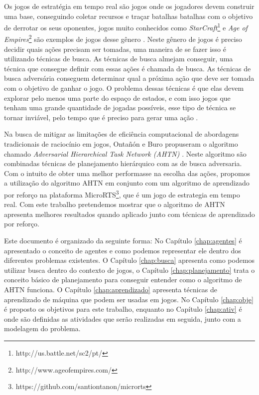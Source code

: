 Os jogos de estratégia em tempo real são jogos onde os jogadores devem construir uma base, conseguindo coletar recursos e traçar batalhas batalhas com o objetivo de derrotar os seus oponentes, jogos muito conhecidos como \textit{StarCraft}\footnote{http://us.battle.net/sc2/pt/} e \textit{Age of Empires}\footnote{http://www.ageofempires.com/} são exemplos de jogos desse gênero \cite{ontanon2013survey}.
Neste gênero de jogos é preciso decidir quais ações precisam ser tomadas, uma maneira de se fazer isso é utilizando técnicas de busca. As técnicas de busca almejam conseguir, uma técnica que consegue definir com essas ações é chamada de busca.
As técnicas de busca adversária conseguem determinar qual a próxima ação que deve ser tomada com o objetivo de ganhar o jogo. O problema dessas técnicas é que elas devem explorar pelo menos uma parte do espaço de estados, e com isso jogos que tenham uma grande quantidade de jogadas possíveis, esse tipo de técnica se tornar inviável, pelo tempo que é preciso para gerar uma ação \cite{ontanon2012experiments}.  

Na busca de mitigar as limitações de eficiência computacional de abordagens tradicionais de raciocínio em jogos, Ontañón e Buro propuseram o algoritmo chamado \textit{Adversarial Hierarchical Task Network (AHTN)} \cite{ontanon2015adversarial}. 
Neste algoritmo são combinadas técnicas de planejamento hierárquico com as de busca adversaria. 
Com o intuito de obter uma melhor performasse na escolha das ações, propomos a utilização do algoritmo AHTN em conjunto com um algoritmo de aprendizado por reforço na plataforma MicroRTS\footnote{https://github.com/santiontanon/microrts}, que é um jogo de estrategia em tempo real. 
Com este trabalho pretendemos mostrar que o algoritmo de AHTN apresenta melhores resultados quando aplicado junto com técnicas de aprendizado por reforço. 

Este documento é organizado da seguinte forma: No Capítulo \ref{chap:agentes} é apresentado o conceito de agentes e como podemos representar ele dentro dos diferentes problemas existentes. O Capítulo \ref{chap:busca} apresenta como podemos utilizar busca dentro do contexto de jogos, o Capítulo \ref{chap:planejamento} trata o conceito básico de planejamento para conseguir entender como o algoritmo de AHTN funciona. O Capítulo \ref{chap:aprendizado} apresenta técnicas de aprendizado de máquina que podem ser usadas em jogos. No Capítulo \ref{chap:obje} é proposto os objetivos para este trabalho, enquanto no Capítulo \ref{chap:ativ} é onde são definidas as atividades que serão realizadas em seguida, junto com a modelagem do problema.   
